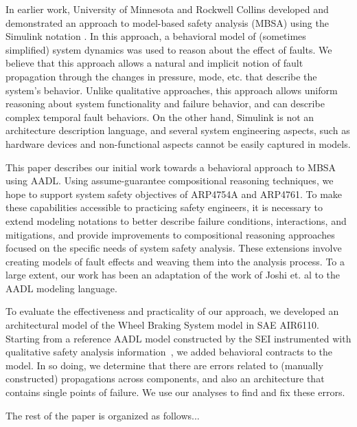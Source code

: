 In earlier work, University of Minnesota and Rockwell Collins developed and demonstrated an approach to model-based safety analysis (MBSA) \cite {Joshi05:Dasc,Joshi05:SafeComp,NasaRep:MBSA-Aug05} using the Simulink notation \cite{MathWorks}.  In this approach, a behavioral model of (sometimes simplified) system dynamics was used to reason about the effect of faults.  We believe that this approach allows a natural and implicit notion of fault propagation through the changes in pressure, mode, etc. that describe the system's behavior.  Unlike qualitative approaches, this approach allows uniform reasoning about system functionality and failure behavior, and can describe complex temporal fault behaviors.  On the other hand, Simulink is not an architecture description language, and several system engineering aspects, such as hardware devices and non-functional aspects cannot be easily captured in models.

\iffalse
Over the last five years, several research groups have focused on formal reasoning at the system architecture level, resulting in MBSE tools that incorporate assume-guarantee compositional reasoning techniques~\cite{Trento and Rockwell and UMN}.  These tools allow behavioral reasoning about complex system models, but with substantially greater scalability than previous approaches.
\fi

This paper describes our initial work towards a behavioral approach to MBSA using AADL.  Using assume-guarantee compositional reasoning techniques, we hope to support system safety objectives of ARP4754A and ARP4761.  To make these capabilities accessible to practicing safety engineers, it is necessary to extend modeling notations to better describe failure conditions, interactions, and mitigations, and provide improvements to compositional reasoning approaches focused on the specific needs of system safety analysis.  These extensions involve creating models of fault effects and weaving them into the analysis process.  To a large extent, our work has been an adaptation of the work of Joshi et. al to the AADL modeling language.

To evaluate the effectiveness and practicality of our approach, we developed an architectural model of the Wheel Braking System model in SAE AIR6110.  Starting from a reference AADL model constructed by the SEI instrumented with qualitative safety analysis information~\cite{SEI:AADL}, we added behavioral contracts to the model.  In so doing, we determine that there are errors related to (manually constructed) propagations across components, and also an architecture that contains single points of failure.  We use our analyses to find and fix these errors.

The rest of the paper is organized as follows...



